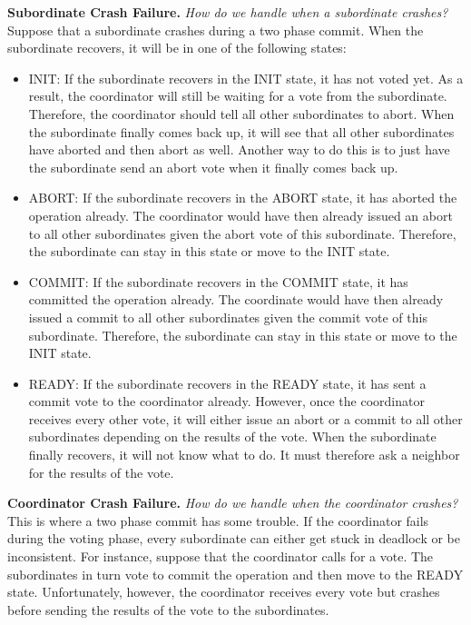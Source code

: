 \documentclass[twoside]{article}
\begin{document}
\textbf{Subordinate Crash Failure.} \emph{How do we handle when a subordinate crashes?} Suppose that a subordinate crashes during a two phase commit. When the subordinate recovers, it will be in one of the following states:
\begin{itemize}
    \item {\ttfamily INIT}: If the subordinate recovers in the {\ttfamily INIT} state, it has not voted yet. As a result, the coordinator will still be waiting for a vote from the subordinate. Therefore, the coordinator should tell all other subordinates to abort. When the subordinate finally comes back up, it will see that all other subordinates have aborted and then abort as well. Another way to do this is to just have the subordinate send an abort vote when it finally comes back up.
    \item {\ttfamily ABORT}: If the subordinate recovers in the {\ttfamily ABORT} state, it has aborted the operation already. The coordinator would have then already issued an abort to all other subordinates given the abort vote of this subordinate. Therefore, the subordinate can stay in this state or move to the {\ttfamily INIT} state.
    \item {\ttfamily COMMIT}: If the subordinate recovers in the {\ttfamily COMMIT} state, it has committed the operation already. The coordinate would have then already issued a commit to all other subordinates given the commit vote of this subordinate. Therefore, the subordinate can stay in this state or move to the {\ttfamily INIT} state.
    \item {\ttfamily READY}: If the subordinate recovers in the {\ttfamily READY} state, it has sent a commit vote to the coordinator already. However, once the coordinator receives every other vote, it will either issue an abort or a commit to all other subordinates depending on the results of the vote. When the subordinate finally recovers, it will not know what to do. It must therefore ask a neighbor for the results of the vote.
\end{itemize}

\textbf{Coordinator Crash Failure.} \emph{How do we handle when the coordinator crashes?} This is where a two phase commit has some trouble. If the coordinator fails during the voting phase, every subordinate can either get stuck in deadlock or be inconsistent. For instance, suppose that the coordinator calls for a vote. The subordinates in turn vote to commit the operation and then move to the {\ttfamily READY} state. Unfortunately, however, the coordinator receives every vote but crashes before sending the results of the vote to the subordinates. 
\end{document}
